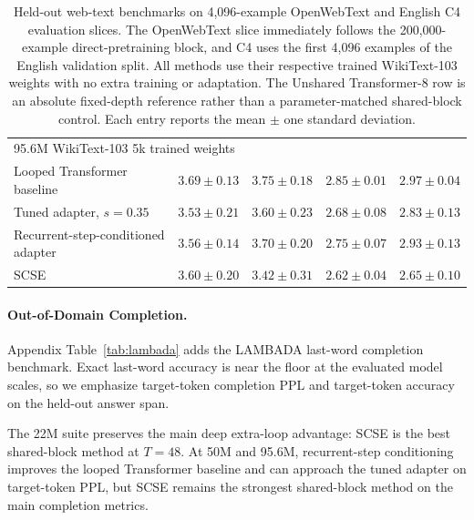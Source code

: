 \documentclass[letterpaper]{article} %
\newcommand{\SCSE}{\textsc{SCSE}}
\theoremstyle{remark}
\begin{document}
\begin{table}[t!]
\begin{tabular}{lrrrr}
		\midrule
		\multicolumn{5}{l}{95.6M WikiText-103 5k trained weights}                                                                                                                            \\
		Looped Transformer baseline                   & $3.69\pm0.13$                                & $3.75\pm0.18$                       & $2.85\pm0.01$          & $2.97\pm0.04$          \\
		Tuned adapter, $s=0.35$                       & $\mathbf{3.53\pm0.21}$                       & $3.60\pm0.23$                       & $2.68\pm0.08$          & $2.83\pm0.13$          \\
		Recurrent-step-conditioned adapter            & $3.56\pm0.14$                                & $3.70\pm0.20$                       & $2.75\pm0.07$          & $2.93\pm0.13$          \\
		\SCSE{}                                       & $3.60\pm0.20$                                & $\mathbf{3.42\pm0.31}$              & $\mathbf{2.62\pm0.04}$ & $\mathbf{2.65\pm0.10}$ \\
		\bottomrule
	\end{tabular}
	\caption{Held-out web-text benchmarks on 4,096-example OpenWebText and English C4 evaluation slices.  The OpenWebText slice immediately follows the 200,000-example direct-pretraining block, and C4 uses the first 4,096 examples of the English validation split.  All methods use their respective trained WikiText-103 weights with no extra training or adaptation.  The Unshared Transformer-8 row is an absolute fixed-depth reference rather than a parameter-matched shared-block control.  Each entry reports the mean $\pm$ one standard deviation.}
	\label{tab:heldout_transfer}
\end{table}

\paragraph{Out-of-Domain Completion.} Appendix Table~\ref{tab:lambada} adds the LAMBADA last-word completion benchmark.  Exact last-word accuracy is near the floor at the evaluated model scales, so we emphasize target-token completion PPL and target-token accuracy on the held-out answer span.

The 22M suite preserves the main deep extra-loop advantage: \SCSE{} is the best shared-block method at $T=48$.  At 50M and 95.6M, recurrent-step conditioning improves the looped Transformer baseline and can approach the tuned adapter on target-token PPL, but \SCSE{} remains the strongest shared-block method on the main completion metrics.
\end{document}
